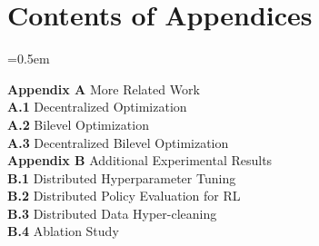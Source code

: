 \documentclass{article}
\theoremstyle{plain}
\theoremstyle{definition}
\theoremstyle{remark}
\begin{document}
\nocite{langley00}




\newpage
\appendix
\onecolumn

\section*{Contents of Appendices}
\parskip=0.5em %

\noindent \textbf{Appendix A} \quad More Related Work \dotfill \pageref{app:related_more} \\
\noindent \hspace*{2em} \textbf{A.1} \quad Decentralized Optimization \dotfill \pageref{app:decentralized_opt} \\
\noindent \hspace*{2em} \textbf{A.2} \quad Bilevel Optimization \dotfill \pageref{app:bilevel} \\
\noindent \hspace*{2em} \textbf{A.3} \quad Decentralized Bilevel Optimization \dotfill \pageref{app:decentralized_bilevel} \\

\noindent \textbf{Appendix B} \quad Additional Experimental Results \dotfill \pageref{app:extra_exp} \\
\noindent \hspace*{2em} \textbf{B.1} \quad Distributed Hyperparameter Tuning \dotfill \pageref{app:extra_hpo} \\
\noindent \hspace*{2em} \textbf{B.2} \quad Distributed Policy Evaluation for RL \dotfill \pageref{app:extra_rl} \\
\noindent \hspace*{2em} \textbf{B.3} \quad Distributed Data Hyper-cleaning \dotfill \pageref{app:extra_cleaning} \\
\noindent \hspace*{2em} \textbf{B.4} \quad Ablation Study \dotfill \pageref{app:extra_ablation} \\
\end{document}
